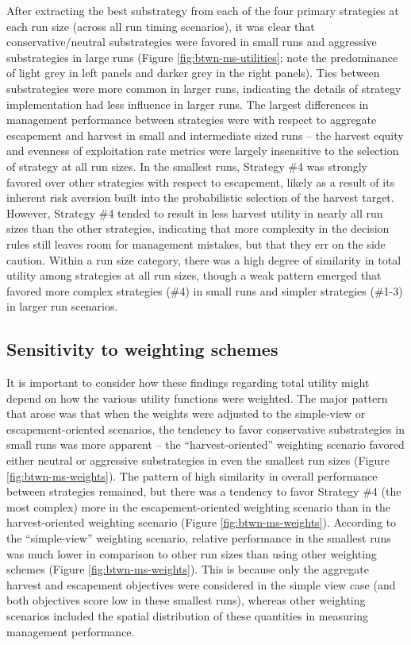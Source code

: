 \documentclass[12pt,]{book}
\theoremstyle{definition}
\theoremstyle{definition}
\theoremstyle{definition}
\theoremstyle{remark}
\begin{document}
\noindent
After extracting the best substrategy from each of the four primary
strategies at each run size (across all run timing scenarios), it was
clear that conservative/neutral substrategies were favored in small runs
and aggressive substrategies in large runs (Figure
\ref{fig:btwn-ms-utilities}; note the predominance of light grey in left
panels and darker grey in the right panels). Ties between substrategies
were more common in larger runs, indicating the details of strategy
implementation had less influence in larger runs. The largest
differences in management performance between strategies were with
respect to aggregate escapement and harvest in small and intermediate
sized runs -- the harvest equity and evenness of exploitation rate
metrics were largely insensitive to the selection of strategy at all run
sizes. In the smallest runs, Strategy \#4 was strongly favored over
other strategies with respect to escapement, likely as a result of its
inherent risk aversion built into the probabilistic selection of the
harvest target. However, Strategy \#4 tended to result in less harvest
utility in nearly all run sizes than the other strategies, indicating
that more complexity in the decision rules still leaves room for
management mistakes, but that they err on the side caution. Within a run
size category, there was a high degree of similarity in total utility
among strategies at all run sizes, though a weak pattern emerged that
favored more complex strategies (\#4) in small runs and simpler
strategies (\#1-3) in larger run scenarios.

\subsection{Sensitivity to weighting
schemes}\label{sensitivity-to-weighting-schemes}

\noindent
It is important to consider how these findings regarding total utility
might depend on how the various utility functions were weighted. The
major pattern that arose was that when the weights were adjusted to the
simple-view or escapement-oriented scenarios, the tendency to favor
conservative substrategies in small runs was more apparent -- the
``harvest-oriented'' weighting scenario favored either neutral or
aggressive substrategies in even the smallest run sizes (Figure
\ref{fig:btwn-ms-weights}). The pattern of high similarity in overall
performance between strategies remained, but there was a tendency to
favor Strategy \#4 (the most complex) more in the escapement-oriented
weighting scenario than in the harvest-oriented weighting scenario
(Figure \ref{fig:btwn-ms-weights}). According to the ``simple-view''
weighting scenario, relative performance in the smallest runs was much
lower in comparison to other run sizes than using other weighting
schemes (Figure \ref{fig:btwn-ms-weights}). This is because only the
aggregate harvest and escapement objectives were considered in the
simple view case (and both objectives score low in these smallest runs),
whereas other weighting scenarios included the spatial distribution of
these quantities in measuring management performance.
\end{document}
